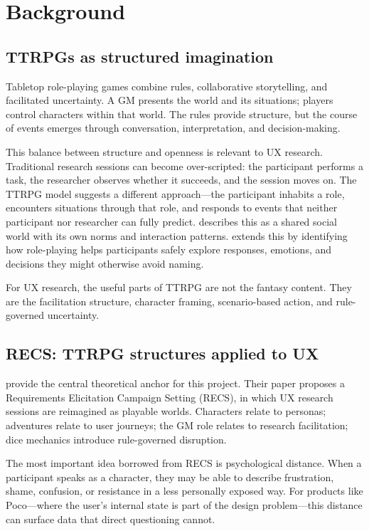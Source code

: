 \documentclass[12pt,a4paper]{report}
\begin{document}
\chapter{Background}

\section{TTRPGs as structured imagination}

Tabletop role-playing games combine rules, collaborative storytelling, and facilitated
uncertainty.
A GM presents the world and its situations; players control characters within that world.
The rules provide structure, but the course of events emerges through conversation,
interpretation, and decision-making.

This balance between structure and openness is relevant to UX research.
Traditional research sessions can become over-scripted: the participant performs a task,
the researcher observes whether it succeeds, and the session moves on.
The TTRPG model suggests a different approach---the participant inhabits a role,
encounters situations through that role, and responds to events that neither participant
nor researcher can fully predict.
\citet{fine1983shared} describes this as a shared social world with its own norms and
interaction patterns.
\citet{bowman2010functions} extends this by identifying how role-playing helps
participants safely explore responses, emotions, and decisions they might otherwise avoid
naming.

For UX research, the useful parts of TTRPG are not the fantasy content.
They are the facilitation structure, character framing, scenario-based action, and
rule-governed uncertainty.

\section{RECS: TTRPG structures applied to UX}

\citet{sturdee2023ttrpg} provide the central theoretical anchor for this project.
Their paper proposes a Requirements Elicitation Campaign Setting (RECS), in which UX
research sessions are reimagined as playable worlds.
Characters relate to personas; adventures relate to user journeys; the GM role relates
to research facilitation; dice mechanics introduce rule-governed disruption.

The most important idea borrowed from RECS is psychological distance.
When a participant speaks as a character, they may be able to describe frustration,
shame, confusion, or resistance in a less personally exposed way.
For products like Poco---where the user's internal state is part of the design
problem---this distance can surface data that direct questioning cannot.
\end{document}
